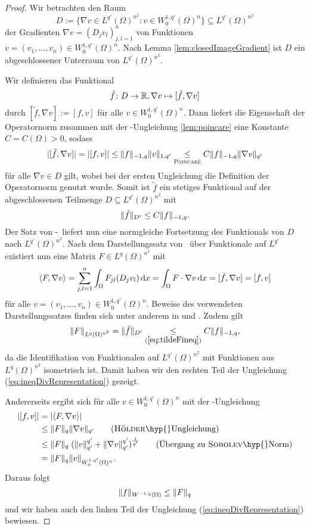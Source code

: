 \begin{proof}
  Wir betrachten den Raum
  $$
  D := \{\nabla v \in L^{q'}(\Omega)^{n^2} \colon v \in W_0^{1,q'}(\Omega)^n\} \subseteq L^{q'}(\Omega)^{n^2}
  $$
  der Gradienten $\nabla v = (D_j v_l)_{j,l=1}^n$ von Funktionen $v = (v_1,\dots,v_n) \in W_0^{1,q'}(\Omega)^n$.
  Nach Lemma \ref{lem:closedImageGradient} ist $D$ ein abgeschlossener Unterraum von $L^{q'}(\Omega)^{n^2}$.

  Wir definieren das Funktional
  $$
  \tilde f \colon D \to \R, \nabla v \mapsto [\tilde f, \nabla v]
  $$
  durch $[\tilde f, \nabla v] := [f, v]$ für alle $v \in W_0^{1,q'}(\Omega)^n$.
  Dann liefert die Eigenschaft der Operatornorm zusammen mit der \poincare\hyp{}Ungleichung \ref{lem:poincare} eine Konstante $C = C(\Omega) > 0$, sodass 
  $$
  |[\tilde f, \nabla v]| 
  = |[f, v]| 
  \leq \norm{f}_{-1,q} \norm{v}_{1,q'}
  \underset{\poincare}{\leq} C \norm{f}_{-1,q} \norm{\nabla v }_{q'}
  $$
  für alle $\nabla v \in D$ gilt, wobei bei der ersten Ungleichung die Definition der Operatornorm genutzt wurde.
  Somit ist $\tilde f$ ein stetiges Funktional auf der abgeschlossenen Teilmenge $D \subseteq L^{q'}(\Omega)^{n^2}$ mit 
  \begin{equation}
    \label{eq:tildeFineq}
    \norm{\tilde f}_{D'} \leq C\norm{f}_{-1,q}.
  \end{equation}
  Der Satz von \hahn\hyp{}\banach\ liefert nun eine normgleiche Fortsetzung des Funktionals von $D$ nach $L^{q'}(\Omega)^{n^2}$.
  Nach dem Darstellungssatz von \riesz\ über Funktionale auf $L^{q'}$  existiert nun eine Matrix $F \in L^{q}(\Omega)^{n^2}$ mit
  $$
  \langle F, \nabla v \rangle
  = \sum_{j,l=1}^n \int_\Omega F_{jl}(D_j v_l) \d x
  = \int_\Omega F \cdot \nabla v \d x
  = [\tilde f, \nabla v] 
  = [f, v]
  $$
  für alle $v = (v_1,\dots,v_n) \in W_0^{1,q'}(\Omega)^n$.
  Beweise des verwendeten Darstellungssatzes finden sich unter anderem in \cite[S.47, Theorem 2.44]{adams2003sobolev} und \cite[S.60, Satz II.2.4]{werner2011fa}.
  Zudem gilt
  $$ 
  \norm{F}_{L^q(\Omega)^{n^2}} 
  = \norm{\tilde f}_{D'} 
  \underset{(\ref{eq:tildeFineq})}{\leq} C \norm{f}_{-1,q},$$
  da die Identifikation von Funktionalen auf $L^{q'}(\Omega)^{n^2}$ mit Funktionen aus $L^q(\Omega)^{n^2}$ isometrisch ist.
  Damit haben wir den rechten Teil der Ungleichung (\ref{eq:ineqDivRepresentation}) gezeigt.

  Andererseits ergibt sich für alle $v \in W_0^{1,q'}(\Omega)^n$ mit der \hoelder\hyp{}Ungleichung
  \begin{align*}
    |[f,v]| 
    &= |\langle F, \nabla v\rangle|  \\
    &\leq \norm{F}_q \norm{\nabla v}_{q'}  \tag{\hoelder\hyp{}Ungleichung}\\
    &\leq \norm{F}_q \;(\norm{v}_{q'}^{q'} + \norm{\nabla v}_{q'}^{q'})^{\frac{1}{q'}} \tag{Übergang zu \sobolev\hyp{}Norm}\\
    &= \norm{F}_q \norm{v}_{W_0^{1,q'}(\Omega)^n}.
  \end{align*}
  Daraus folgt
  $$
  \norm{f}_{W^{-1,q}(\Omega)} \leq \norm{F}_q
  $$
  und wir haben auch den linken Teil der Ungleichung (\ref{eq:ineqDivRepresentation}) bewiesen.


\end{proof}
